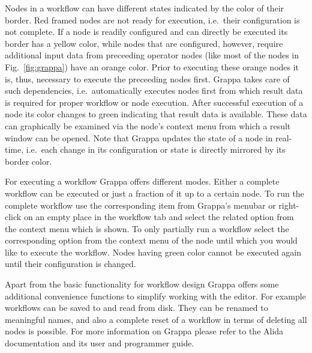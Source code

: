 Nodes in a workflow can have different states indicated by the color of their border. Red framed
nodes are not ready for execution, i.e.~their configuration is not complete. If a node is readily
configured and can directly be executed its border has a yellow color, while nodes that are 
configured, however, require additional input data from preceeding operator nodes (like most of 
the nodes in Fig.~\ref{fig:grappa}) have an orange color. Prior to executing these orange nodes it
is, thus, necessary to execute the preceeding nodes first. Grappa takes care of such 
dependencies, i.e.~automatically executes nodes first from which result data is required for 
proper workflow or node execution.
After successful execution of a node its color 
changes to green indicating that result data is available. These data can graphically be examined 
via the node's context menu from which a result window can be opened. 
Note that Grappa updates the state of a node in 
real-time, i.e.~each change in its configuration or state is directly mirrored by its border color.

For executing a workflow Grappa offers different modes. Either a complete workflow can be 
executed or just a fraction of it up to a certain node. To run the complete workflow use the
corresponding item from Grappa's menubar or right-click on an empty place in the workflow tab and
select the related option from the context menu which is shown. To only partially run a workflow
select the corresponding option from the context menu of the node until which you would like to 
execute the workflow. Nodes having green color cannot be executed again until their configuration 
is changed.

Apart from the basic functionality for workflow design Grappa offers some additional convenience 
functions to simplify working with the editor. For example workflows can be saved to 
and read from disk. They can be renamed to meaningful names, and also a complete reset of a 
workflow in terms of deleting all nodes is possible. For more information on Grappa please refer
to the Alida documentation and its user and programmer guide.
